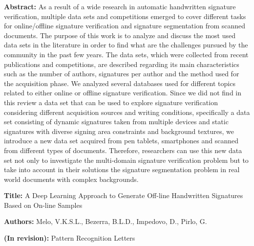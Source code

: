 \begin{apendicesenv}
\textbf{Abstract:} As a result of a wide research in automatic handwritten signature verification, multiple data sets and competitions emerged to cover different tasks for online/offline signature verification and signature segmentation from scanned documents. The purpose of this work is to analyze and discuss the most used data sets in the literature in order to find what are the challenges pursued by the community in the past few years. The data sets, which were collected from recent publications and competitions, are described regarding its main characteristics such as the number of authors, signatures per author and the method used for the acquisition phase. We analyzed several databases used for different topics related to either online or offline signature verification. Since we did not find in this review a data set that can be used to explore signature verification considering different acquisition sources and writing conditions, specifically a data set consisting of dynamic signatures taken from multiple devices and static signatures with diverse signing area constraints and background textures, we introduce a new data set acquired from pen tablets, smartphones and scanned from different types of documents. Therefore, researchers can use this new data set not only to investigate the multi-domain signature verification problem but to take into account in their solutions the signature segmentation problem in real world documents with complex backgrounds.

\hspace{0.6in}

\textbf{Title:} A Deep Learning Approach to Generate Off-line Handwritten Signatures Based on On-line Samples

\textbf{Authors:} Melo, V.K.S.L., Bezerra, B.L.D., Impedovo, D., Pirlo, G.

\textbf{(In revision):} Pattern Recognition Letters


\end{apendicesenv}
